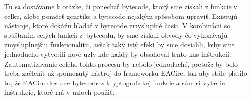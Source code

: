 Tu sa dostávame k otázke, či ponechať bytecode, ktorý sme získali z funkcie v celku, alebo pomôcť genetike a bytecode nejakým spôsobom upraviť. Existujú nástroje, ktoré dokážu hľadať v bytecode zmysluplné časti. V kombinácii so spúšťaním celých funkcií z~bytecodu, by sme získali obvody čo vykonávajú zmysluplnejšiu funkcionalitu, avšak taký istý efekt by sme dosiahli, keby sme jednoducho vytvorili nové uzly kde každý by obsahoval tento kus inštrukcií. Zautomatizovanie celého tohto procesu by nebolo jednoduché, pretože by bolo treba začleniť už spomenutý nástroj do frameworku EACirc, tak aby stále platilo to, že EACirc dostane bytecode z kryptografickej funkcie a sám si vyberie inštrukcie, ktoré má v uzloch použiť. 



 

